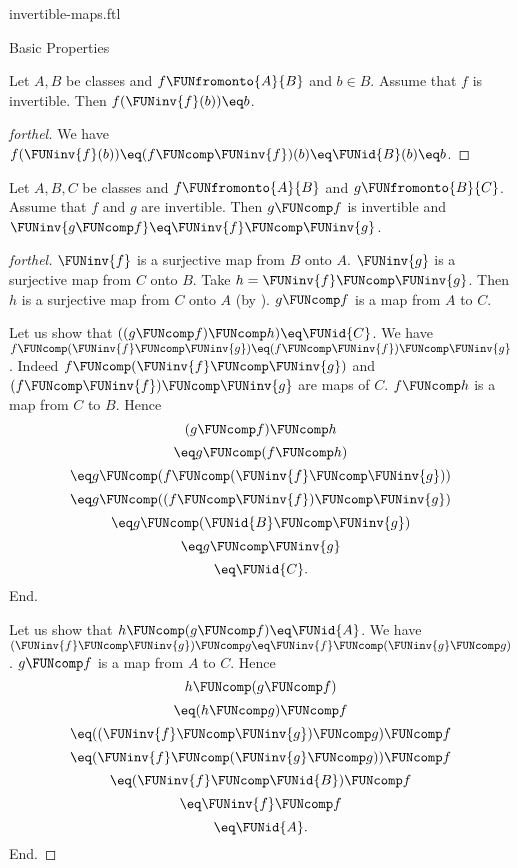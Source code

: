 \documentclass{naproche-library}
\begin{document}
\begin{smodule}[title=Invertible Maps]{invertible-maps.ftl}
\begin{sfragment}{Basic Properties}
  \begin{proposition}[forthel,id=FOUNDATIONS_09_6093864386712935]
    Let $A, B$ be classes and $f \FUNfromonto{A}{B}$ and $b \in B$.
    Assume that $f$ is invertible.
    Then $f(\FUNinv{f}(b)) \eq b$.
  \end{proposition}
  \begin{proof}[forthel]
    We have
    $f(\FUNinv{f}(b))
      \eq (f \FUNcomp \FUNinv{f})(b)
      \eq \FUNid{B}(b)
      \eq b$.
  \end{proof}

  \begin{proposition}[forthel,id=FOUNDATIONS_09_7619151963095040]
    Let $A, B, C$ be classes and $f \FUNfromonto{A}{B}$ and $g \FUNfromonto{B}{C}$.
    Assume that $f$ and $g$ are invertible.
    Then $g \FUNcomp f$ is invertible and $\FUNinv{g \FUNcomp f} \eq \FUNinv{f} \FUNcomp \FUNinv{g}$.
  \end{proposition}
  \begin{proof}[forthel]
    $\FUNinv{f}$ is a surjective map from $B$ onto $A$.
    $\FUNinv{g}$ is a surjective map from $C$ onto $B$.
    Take $h = \FUNinv{f} \FUNcomp \FUNinv{g}$.
    Then $h$ is a surjective map from $C$ onto $A$ (by ).
    $g \FUNcomp f$ is a map from $A$ to $C$.

    Let us show that $((g \FUNcomp f) \FUNcomp h) \eq \FUNid{C}$.
      We have $f \FUNcomp (\FUNinv{f} \FUNcomp \FUNinv{g}) \eq (f \FUNcomp \FUNinv{f}) \FUNcomp \FUNinv{g}$.
      Indeed $f \FUNcomp (\FUNinv{f} \FUNcomp \FUNinv{g})$ and $(f \FUNcomp \FUNinv{f}) \FUNcomp \FUNinv{g}$ are maps of $C$.
      $f \FUNcomp h$ is a map from $C$ to $B$.
      Hence
      \[  (g \FUNcomp f) \FUNcomp h                           \]
      \[    \eq g \FUNcomp (f \FUNcomp h)                       \]
      \[    \eq g \FUNcomp (f \FUNcomp (\FUNinv{f} \FUNcomp \FUNinv{g}))   \]
      \[    \eq g \FUNcomp ((f \FUNcomp \FUNinv{f}) \FUNcomp \FUNinv{g})   \]
      \[    \eq g \FUNcomp (\FUNid{B} \FUNcomp \FUNinv{g})            \]
      \[    \eq g \FUNcomp \FUNinv{g}                            \]
      \[    \eq \FUNid{C}.                                  \]
    End.

    Let us show that $h \FUNcomp (g \FUNcomp f) \eq \FUNid{A}$.
      We have $(\FUNinv{f} \FUNcomp \FUNinv{g}) \FUNcomp g \eq \FUNinv{f} \FUNcomp (\FUNinv{g} \FUNcomp g)$.
      $g \FUNcomp f$ is a map from $A$ to $C$.
      Hence
      \[  h \FUNcomp (g \FUNcomp f)                           \]
      \[    \eq (h \FUNcomp g) \FUNcomp f                       \]
      \[    \eq ((\FUNinv{f} \FUNcomp \FUNinv{g}) \FUNcomp g) \FUNcomp f   \]
      \[    \eq (\FUNinv{f} \FUNcomp (\FUNinv{g} \FUNcomp g)) \FUNcomp f   \]
      \[    \eq (\FUNinv{f} \FUNcomp \FUNid{B}) \FUNcomp f            \]
      \[    \eq \FUNinv{f} \FUNcomp f                            \]
      \[    \eq \FUNid{A}.                                  \]
    End.


\end{proof}
\end{sfragment}
\end{smodule}
\end{document}
